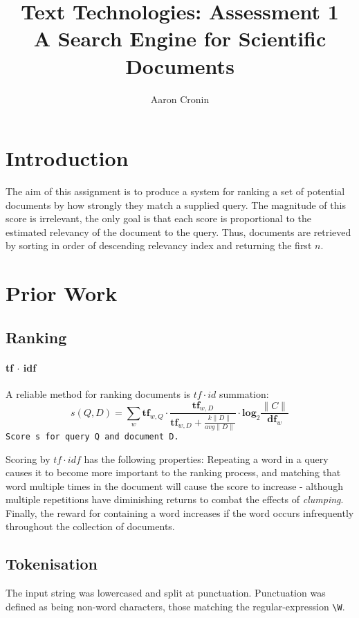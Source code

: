 \documentclass[11pt, a4paper, twocolumn]{article}   	%
\title{Text Technologies: Assessment 1 \\
A Search Engine for Scientific Documents}
\author{Aaron Cronin}
\date	{}						%
\begin{document}
\selectfont
\maketitle
\section{Introduction}
The aim of this assignment is to produce a system for ranking a set of potential documents by how strongly they match a supplied query. The magnitude of this score is irrelevant, the only goal is that each score is proportional to the estimated relevancy of the document to the query. Thus, documents are retrieved by sorting in order of descending relevancy index and returning the first $n$.
\section{Prior Work}
\subsection{Ranking}
\paragraph{tf $\cdot$ idf}
A reliable method for ranking documents is $tf \cdot id$ summation:
\begin{equation}
s(Q,D) = \sum_{w}\mathbf{tf}_{w, Q} \cdot \frac
{\mathbf{tf}_{w, D}}
{\mathbf{tf}_{w, D} + \frac{k \|D\|}{avg \|D\|}} \cdot \mathbf{log}_{2}\frac{\|C\|}{\mathbf{df}_{w}}
\end{equation}
\verb|Score s for query Q and document D.|

Scoring by $tf \cdot idf$ has the following properties: Repeating a word in a query causes it to become more important to the ranking process, and matching that word multiple times in the document will cause the score to increase - although multiple repetitions have diminishing returns to combat the effects of \emph{clumping}. Finally, the reward for containing a word increases if the word occurs infrequently throughout the collection of documents.

\subsection{Tokenisation}
The input string was lowercased and split at punctuation. Punctuation was defined as being non-word characters, those matching the regular-expression \verb|\W|.
\end{document}
